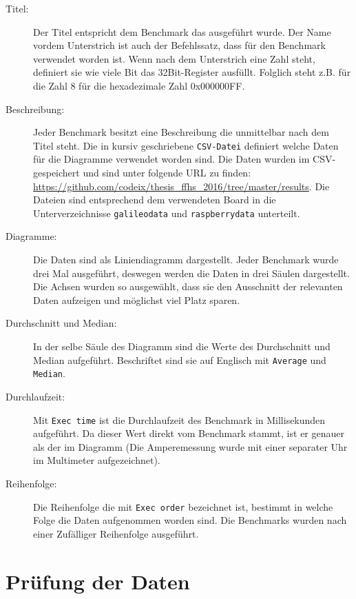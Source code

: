 \begin{description}
\item[Titel:]
Der Titel entspricht dem Benchmark das ausgeführt wurde. Der Name vordem Unterstrich ist auch der Befehlssatz, dass für den Benchmark verwendet worden ist. Wenn nach dem Unterstrich eine Zahl steht, definiert sie wie viele Bit das 32Bit-Register ausfüllt. Folglich steht z.B. für die Zahl 8 für die hexadezimale Zahl 0x000000FF.
\item[Beschreibung:]
Jeder Benchmark besitzt eine Beschreibung die unmittelbar nach dem Titel steht. Die in kursiv geschriebene \texttt{CSV-Datei} definiert welche Daten für die Diagramme verwendet worden sind. Die Daten wurden im CSV-gespeichert und sind unter folgende URL zu finden: \url{https://github.com/codeix/thesis_ffhs_2016/tree/master/results}. Die Dateien sind entsprechend dem verwendeten Board in die Unterverzeichnisse \texttt{galileodata} und \texttt{raspberrydata} unterteilt. 
\item[Diagramme:]
Die Daten sind als Liniendiagramm dargestellt. Jeder Benchmark wurde drei Mal ausgeführt, deswegen werden die Daten in drei Säulen dargestellt. Die Achsen wurden so ausgewählt, dass sie den Ausschnitt der relevanten Daten aufzeigen und möglichst viel Platz sparen.
\item[Durchschnitt und Median:]
In der selbe Säule des Diagramm sind die Werte des Durchschnitt und Median aufgeführt. Beschriftet sind sie auf Englisch mit \texttt{Average} und \texttt{Median}.
\item[Durchlaufzeit:]
Mit \texttt{Exec time} ist die Durchlaufzeit des Benchmark in Millisekunden aufgeführt. Da dieser Wert direkt vom Benchmark stammt, ist er genauer als der im Diagramm (Die Amperemessung wurde mit einer separater Uhr im Multimeter aufgezeichnet).
\item[Reihenfolge:] Die Reihenfolge die mit \texttt{Exec order} bezeichnet ist, bestimmt in welche Folge die Daten aufgenommen worden sind. Die Benchmarks wurden nach einer Zufälliger Reihenfolge ausgeführt.

\end{description}



\section{Prüfung der Daten}

